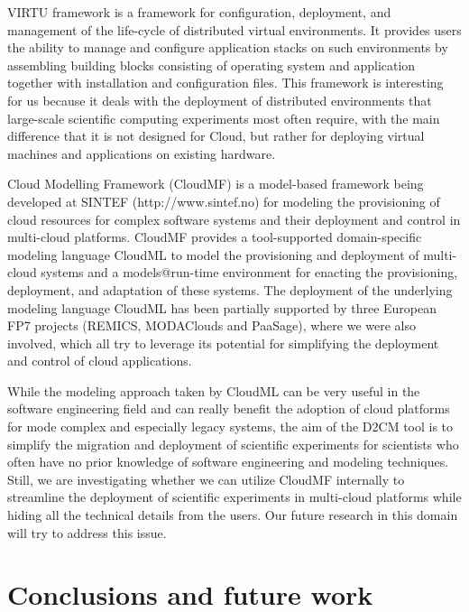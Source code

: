 \documentclass[a4paper,10pt]{article}
\begin{document}
VIRTU framework \cite{DuroSLPM10} is a framework for configuration, deployment, and management of the life-cycle of distributed virtual environments. It provides users the ability to manage and configure application stacks on such environments by assembling building blocks consisting of operating system and application together with installation and configuration files. This framework is interesting for us because it deals with the deployment of distributed environments that large-scale scientific computing experiments most often require, with the main difference that it is not designed for Cloud, but rather for deploying virtual machines and applications on existing hardware.  




Cloud Modelling Framework (CloudMF) \cite{Ferry:2013:MMS:2513534.2513542} is a model-based framework being developed at SINTEF (http://www.sintef.no) for modeling the provisioning of cloud resources for complex software systems and their deployment and control in multi-cloud platforms. CloudMF provides a tool-supported domain-specific modeling language CloudML to model the provisioning and deployment of multi-cloud systems and a models@run-time environment for enacting the provisioning, deployment, and adaptation of these systems. The deployment of the underlying modeling language CloudML has been partially supported by three European FP7 projects (REMICS, MODAClouds and PaaSage), where we were also involved, which all try to leverage its potential for simplifying the deployment and control of cloud applications. 

While the modeling approach taken by CloudML can be very useful in the software engineering field and can really benefit the adoption of cloud platforms for mode complex and especially legacy systems, the aim of the D2CM tool is to simplify the migration and deployment of scientific experiments for scientists who often have no prior knowledge of software engineering and modeling techniques. Still, we are investigating whether we can utilize CloudMF internally to streamline the deployment of scientific experiments in multi-cloud platforms while hiding all the technical details from the users. Our future research in this domain will try to address this issue. 








\section{Conclusions and future work}
\end{document}
